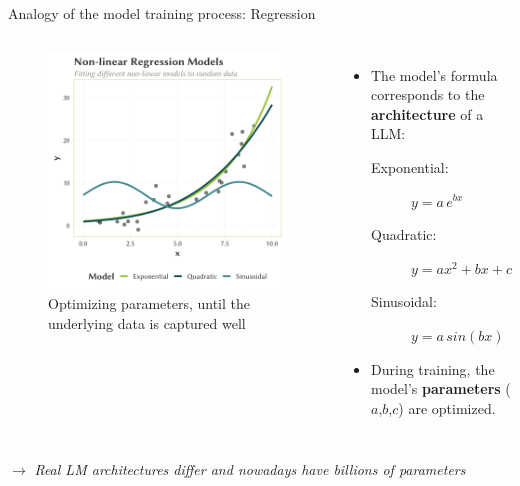 \documentclass[10pt]{beamer}
\newcommand{\feature}[1]{{\color{scLime} \textbf{#1}}}
\newcommand{\remark}[1]{{\par \color{scGrape} \ensuremath{\rightarrow} \emph{#1}}}
\begin{document}
\begin{frame}{Analogy of the model training process: Regression}
	\begin{columns}[T,onlytextwidth]
		\hspace*{-0.7cm} 
		\begin{figure}
			\includegraphics[width=\textwidth]{figures/NonlinearRegression.png}
			\caption{Optimizing parameters, until the underlying data is captured well}
		\end{figure}
		\vspace{1cm}
		\begin{itemize}
			\item The model's formula corresponds to the \feature{architecture} of a LLM:\linebreak
			\begin{description}
				\item[Exponential:] $y=a\, e^{bx}$
				\item[Quadratic:] $y=a x^2 + bx + c$
				\item[Sinusoidal:] $y=a\,sin(bx)$
			\end{description}
			\item During training, the model's \feature{parameters} ($a$,$b$,$c$) are optimized.
		\end{itemize}
	\end{columns}
	\remark{Real LM architectures differ and nowadays have billions of parameters}
\end{frame}
\end{document}
